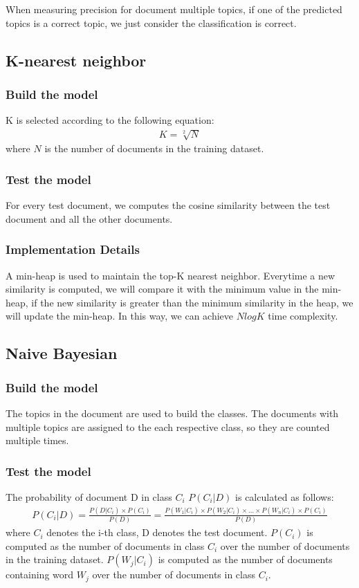 \documentclass{article}
\begin{document}
When measuring precision for document multiple topics, if one of the predicted
topics is a correct topic, we just consider the classification is correct.

\subsection{K-nearest neighbor}
\subsubsection{Build the model}
K is selected according to the following equation:
\begin{align*}K = \sqrt[2]{N}\end{align*}
where $N$ is the number of documents in the training dataset.
\subsubsection{Test the model}
For every test document, we computes the cosine similarity between the test document and all the other documents.
\subsubsection{Implementation Details}
A min-heap is used to maintain the top-K nearest neighbor. Everytime a new similarity is computed, we will compare it with the minimum value in the min-heap, if the new similarity is greater than the minimum similarity in the heap, we will update the min-heap. In this way, we can achieve $Nlog K$ time complexity.
\subsection{Naive Bayesian}
\subsubsection{Build the model}
The topics in the document are used to build the classes. The documents with multiple topics are assigned to the each respective class, so they are counted multiple times. 

\subsubsection{Test the model}
The probability of document D in class $C_i$ $P(C_i|D)$ is calculated as
follows:
\begin{align*}
P(C_i|D) = \frac{P(D|C_i) \times P(C_i)}{P(D)}
	 = \frac{P(W_1|C_i) \times P(W_2|C_i) \times ... \times P(W_n|C_i) \times P(C_i)}{P(D)}				
\end{align*}
where $C_i$ denotes the i-th class, D denotes the test document. $P(C_i)$ is computed as the number of documents in class $C_i$ over the number of documents in the training dataset. $P(W_j|C_i)$ is computed as the number of documents containing word $W_j$ over the number of documents in class $C_i$.
\end{document}
